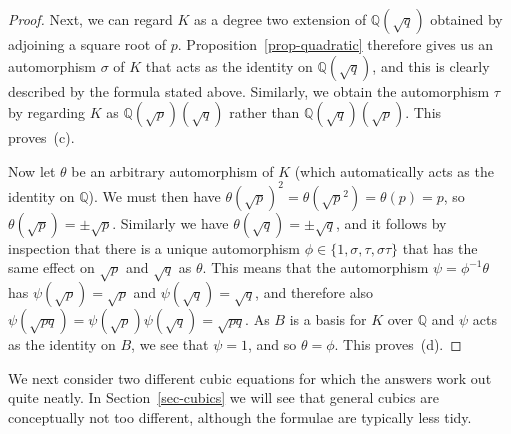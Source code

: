\documentclass{amsart}
\newcommand{\Q}         {{\mathbb{Q}}}
\newcommand{\tht}       {\theta}
\newcommand{\sg}        {\sigma}
\renewcommand{\:}{\colon}
\theoremstyle{definition}
\begin{document}
\begin{proof}
 Next, we can regard $K$ as a degree two extension of $\Q(\sqrt{q})$
 obtained by adjoining a square root of $p$.
 Proposition~\ref{prop-quadratic} therefore gives us an automorphism
 $\sg$ of $K$ that acts as the identity on $\Q(\sqrt{q})$, and this is
 clearly described by the formula stated above.  Similarly, we obtain
 the automorphism $\tau$ by regarding $K$ as $\Q(\sqrt{p})(\sqrt{q})$
 rather than $\Q(\sqrt{q})(\sqrt{p})$.  This proves~(c).

 Now let $\tht$ be an arbitrary automorphism of $K$ (which
 automatically acts as the identity on $\Q$).  We must then have
 $\tht(\sqrt{p})^2=\tht(\sqrt{p}^2)=\tht(p)=p$, so
 $\tht(\sqrt{p})=\pm\sqrt{p}$.  Similarly we have 
 $\tht(\sqrt{q})=\pm\sqrt{q}$, and it follows by inspection that there
 is a unique automorphism $\phi\in\{1,\sg,\tau,\sg\tau\}$ that has the
 same effect on $\sqrt{p}$ and $\sqrt{q}$ as $\tht$.  This means that
 the automorphism $\psi=\phi^{-1}\tht$ has $\psi(\sqrt{p})=\sqrt{p}$
 and $\psi(\sqrt{q})=\sqrt{q}$, and therefore also
 $\psi(\sqrt{pq})=\psi(\sqrt{p})\psi(\sqrt{q})=\sqrt{pq}$.  As $B$ is
 a basis for $K$ over $\Q$ and $\psi$ acts as the identity on $B$, we
 see that $\psi=1$, and so $\tht=\phi$.  This proves~(d).
\end{proof}

We next consider two different cubic equations for which the answers
work out quite neatly.  In Section~\ref{sec-cubics} we will see that
general cubics are conceptually not too different, although the
formulae are typically less tidy.
\end{document}
